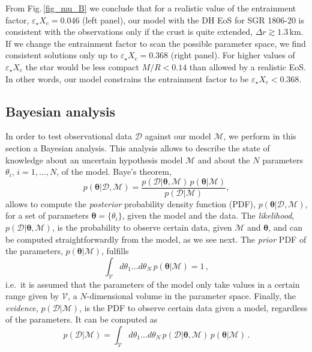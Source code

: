 \documentclass[useAMS,usenatbib]{mnras}
\newcommand{\D}[0]{{\mathcal D}}
\newcommand{\M}[0]{{\mathcal M}}
\newcommand{\V}[0]{{\mathcal V}}
\begin{document}
From Fig.\,\ref{fig_mu_B} we conclude that for a realistic value of the 
entrainment factor, $\varepsilon_\star X_c=0.046$ (left panel), our model with 
the DH EoS for SGR 1806-20 is consistent with the observations only 
if the crust is quite extended, $\Delta r \gtrsim1.3\,$km. If we change the 
entrainment factor to scan the possible parameter space, we find consistent 
solutions only up to $\varepsilon_\star X_c=0.368$ (right panel). For higher 
values of $\varepsilon_\star X_c$ the star would be less compact $M/R<0.14$ than 
allowed by a realistic EoS. In other words, our model constrains the entrainment 
factor to be  $\varepsilon_\star X_c<0.368$.

\subsection{Bayesian analysis}\label{sec_Bayes}

In order to test observational data $\D$ against our model $\M$, we perform in this section a Bayesian analysis. This analysis allows to describe the state of knowledge about an uncertain hypothesis model $\M$ and about the $N$ parameters $\theta_i$, $i=1, \dots, N$, of the model. Baye's theorem,
%
\begin{equation}
p ({\pmb\theta}|\D,\M) = \frac{p (\D|{\pmb \theta},\M) \, p ({\pmb \theta|\M})}{p(\D|\M)},
\end{equation}
%
allows to compute the {\it posterior} probability density function (PDF), $p ({\pmb\theta}|\D,\M)$, for a set of parameters $\pmb{\theta}=\{\theta_i \}$, given the model and the data. The {\it likelihood}, $p (\D|{\pmb \theta},\M)$, is the probability to observe certain data, given $\M$ and $\pmb \theta$, and can be computed straightforwardly from the model,
as we see next. The {\it prior} PDF of the parameters, $p ({\pmb \theta|\M})$, fulfills 
%
\begin{equation}
\int_\V d\theta_1\ldots d\theta_N \, p ({\pmb \theta|\M}) = 1\,, \label{eq:priornorm}
\end{equation}
%
i.e.~it is assumed that the parameters of the model only take values in a certain
range given by $\V$, a $N$-dimensional volume in the parameter space.
Finally, the {\it evidence}, $p(\D|\M)$, is the PDF to observe certain data
given a model, regardless of the parameters. It can be computed as
%
\begin{equation}
p(\D|\M) = \int_\V d\theta_1\ldots d\theta_N  \, p (\D|{\pmb \theta},\M) \, p ({\pmb \theta|\M}) \,.
\end{equation}
%
\end{document}
